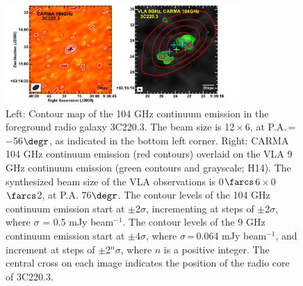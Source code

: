 \documentclass[twocolumn,apj,numberedappendix]{emulateapj}
\newcommand{\CO}{\mbox{CO($J$\,=\,3\,$\rightarrow$\,2) }}
\newcommand{\pmOne}{\mbox{$^{-1}$}}
\begin{document}
\begin{figure}[tbph]
\centering
\includegraphics[width=0.80\textwidth]{Figure/ContPanel.pdf}
\caption{Left: Contour map of the 104 GHz continuum emission in the foreground radio galaxy 3C220.3.
The beam size is 12\,$\times$\,6, at P.A.\,=\,
$-$56$\degr$, as indicated in the bottom left corner. Right: CARMA 104 GHz continuum emission (red contours) overlaid on the VLA 9 GHz continuum emission (green contours and grayscale; H14).
The synthesized beam size of the VLA observations is 0$\farcs$6\,$\times$\,0$\farcs$2, at P.A.
76$\degr$. The contour levels of the 104 GHz continuum emission start at $\pm$2$\sigma$, incrementing at steps
of $\pm$2$\sigma$, where $\sigma$ = 0.5 mJy beam\pmOne. The contour levels of the 9 GHz continuum
emission start at $\pm$4$\sigma$, where $\sigma$\,=\,0.064 mJy beam\pmOne, and increment at steps of $\pm$2$^n\sigma$,
where $n$ is a positive integer.
The central cross on each image indicates the position of the radio core of 3C220.3. \label{fig:cont}}
\end{figure}
\end{document}
